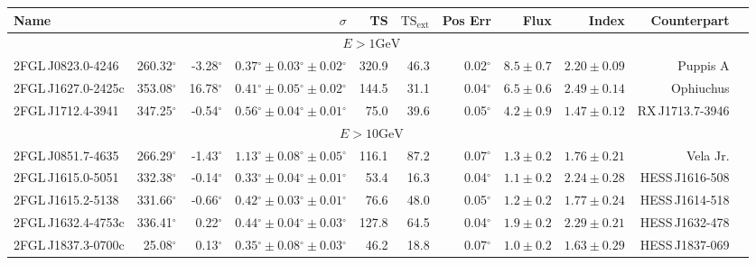 \documentclass[12pt,preprint]{aastex}
\newcommand{\gev}{\text{GeV}\xspace}
\newcommand{\tsext}{{\ensuremath{\text{TS}_{\text{ext}}}}\xspace}
\newcommand{\glon}{\text{GLON}\xspace}
\newcommand{\glat}{\text{GLAT}\xspace}
\renewcommand{\deg}{\ensuremath{^\circ}\xspace}
\begin{document}
\clearpage
\thispagestyle{empty}
\begin{table}
  \begin{centering}
    \begin{tabular}{l|rrlrrrrrrr}
      \hline
      \hline
      Name                 &          \glon &          \glat &                \multicolumn{1}{r}{$\sigma$} &         TS &   $\tsext$ &    Pos Err &                  Flux &                 Index &          Counterpart \\
      \hline
      \multicolumn{10}{c}{$E > 1 \gev$} \\
      \hline
      2FGL\,J0823.0-4246   &     260.32\deg &      -3.28\deg & $  0.37\deg \pm   0.03\deg \pm   0.02\deg $ &      320.9 &       46.3 &   0.02\deg & $    8.5 \pm     0.7$ & $   2.20 \pm    0.09$ &             Puppis A \\
      2FGL\,J1627.0-2425c  &     353.08\deg &      16.78\deg & $  0.41\deg \pm   0.05\deg \pm   0.02\deg $ &      144.5 &       31.1 &   0.04\deg & $    6.5 \pm     0.6$ & $   2.49 \pm    0.14$ &            Ophiuchus \\
      2FGL\,J1712.4-3941   &     347.25\deg &      -0.54\deg & $  0.56\deg \pm   0.04\deg \pm   0.01\deg $ &       75.0 &       39.6 &   0.05\deg & $    4.2 \pm     0.9$ & $   1.47 \pm    0.12$ &     RX\,J1713.7-3946 \\
      \hline
      \multicolumn{10}{c}{$E > 10 \gev$} \\
      \hline
      2FGL\,J0851.7-4635   &     266.29\deg &      -1.43\deg & $  1.13\deg \pm   0.08\deg \pm   0.05\deg $ &      116.1 &       87.2 &   0.07\deg & $    1.3 \pm     0.2$ & $   1.76 \pm    0.21$ &             Vela Jr. \\
      2FGL\,J1615.0-5051   &     332.38\deg &      -0.14\deg & $  0.33\deg \pm   0.04\deg \pm   0.01\deg $ &       53.4 &       16.3 &   0.04\deg & $    1.1 \pm     0.2$ & $   2.24 \pm    0.28$ &      HESS\,J1616-508 \\
      2FGL\,J1615.2-5138   &     331.66\deg &      -0.66\deg & $  0.42\deg \pm   0.03\deg \pm   0.01\deg $ &       76.6 &       48.0 &   0.05\deg & $    1.2 \pm     0.2$ & $   1.77 \pm    0.24$ &      HESS\,J1614-518 \\
      2FGL\,J1632.4-4753c  &     336.41\deg &       0.22\deg & $  0.44\deg \pm   0.04\deg \pm   0.03\deg $ &      127.8 &       64.5 &   0.04\deg & $    1.9 \pm     0.2$ & $   2.29 \pm    0.21$ &      HESS\,J1632-478 \\
      2FGL\,J1837.3-0700c  &      25.08\deg &       0.13\deg & $  0.35\deg \pm   0.08\deg \pm   0.03\deg $ &       46.2 &       18.8 &   0.07\deg & $    1.0 \pm     0.2$ & $   1.63 \pm    0.29$ &      HESS\,J1837-069 \\

\end{tabular}
\end{centering}
\end{table}
\end{document}
